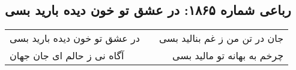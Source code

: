 \begin{center}
\section*{رباعی شماره ۱۸۶۵: در عشق تو خون دیده بارید بسی}
\label{sec:1865}
\begin{longtable}{l p{0.5cm} r}
در عشق تو خون دیده بارید بسی
&&
جان در تن من ز غم بنالید بسی
\\
آگاه نی ز حالم ای جان جهان
&&
چرخم به بهانه تو مالید بسی
\\
\end{longtable}
\end{center}
